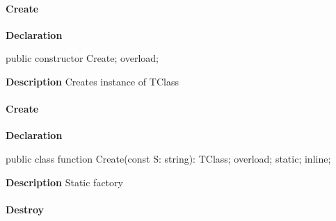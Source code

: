 \documentclass{report}
\begin{document}
\paragraph*{Create}\hspace*{\fill}

\begin{list}{}{
\setlength{\itemindent}{0cm}
\setlength{\listparindent}{0cm}
\setlength{\leftmargin}{\evensidemargin}
\addtolength{\leftmargin}{\tmplength}
\settowidth{\labelsep}{X}
\addtolength{\leftmargin}{\labelsep}
\setlength{\labelwidth}{\tmplength}
}
\begin{flushleft}
\item[\textbf{Declaration}\hfill]
\begin{ttfamily}
public constructor Create; overload;\end{ttfamily}


\end{flushleft}
\par
\item[\textbf{Description}]
Creates instance of TClass

\end{list}
\paragraph*{Create}\hspace*{\fill}

\begin{list}{}{
\setlength{\itemindent}{0cm}
\setlength{\listparindent}{0cm}
\setlength{\leftmargin}{\evensidemargin}
\addtolength{\leftmargin}{\tmplength}
\settowidth{\labelsep}{X}
\addtolength{\leftmargin}{\labelsep}
\setlength{\labelwidth}{\tmplength}
}
\begin{flushleft}
\item[\textbf{Declaration}\hfill]
\begin{ttfamily}
public class function Create(const S: string): TClass; overload; static; inline;\end{ttfamily}


\end{flushleft}
\par
\item[\textbf{Description}]
Static factory

\end{list}
\paragraph*{Destroy}\hspace*{\fill}
\end{document}
